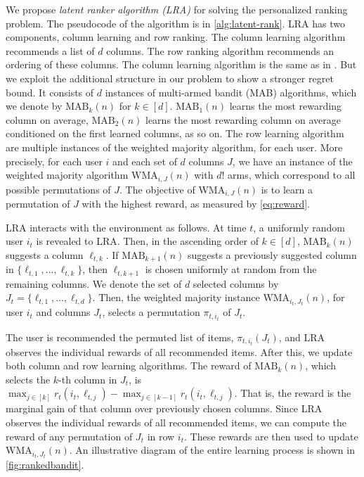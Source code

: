 
We propose \emph{latent ranker algorithm (LRA)} for solving the personalized ranking problem. The pseudocode of the algorithm is in \cref{alg:latent-rank}. LRA has two components, column learning and row ranking. The column learning algorithm recommends a list of $d$ columns. The row ranking algorithm recommends an ordering of these columns. The column learning algorithm is the same as in  \citet{radlinski2008learning}. But we exploit the additional structure in our problem to show a stronger regret bound. It consists of $d$ instances of multi-armed bandit (MAB) algorithms, which we denote by $\textrm{MAB}_k(n)$ for $k \in [d]$. $\textrm{MAB}_1(n)$ learns the most rewarding column on average, $\textrm{MAB}_2(n)$ learns the most rewarding column on average conditioned on the first learned columns, as so on. The row learning algorithm are multiple instances of the weighted majority algorithm, for each user. More precisely, for each user $i$ and each set of $d$ columns $J$, we have an instance of the weighted majority algorithm $\textrm{WMA}_{i, J}(n)$ with $d!$ arms, which correspond to all possible permutations of $J$. The objective of $\textrm{WMA}_{i, J}(n)$ is to learn a permutation of $J$ with the highest reward, as measured by \eqref{eq:reward}.

LRA interacts with the environment as follows. At time $t$, a uniformly random user $i_t$ is revealed to LRA. Then, in the ascending order of $k \in [d]$, $\textrm{MAB}_k(n)$ suggests a column $\ell_{t, k}$. If $\textrm{MAB}_{k + 1}(n)$ suggests a previously suggested column in $\{\ell_{t, 1}, \dots, \ell_{t, k}\}$, then $\ell_{t, k + 1}$ is chosen uniformly at random from the remaining columns. We denote the set of $d$ selected columns by $J_t = \{\ell_{t, 1}, \dots, \ell_{t, d}\}$. Then, the weighted majority instance $\textrm{WMA}_{i_t, J_t}(n)$, for user $i_t$ and columns $J_t$, selects a permutation $\pi_{t, i_t}$ of $J_t$.

The user is recommended the permuted list of items, $\pi_{t, i_t}(J_t)$, and LRA observes the individual rewards of all recommended items. After this, we update both column and row learning algorithms. The reward of $\textrm{MAB}_k(n)$, which selects the $k$-th column in $J_t$, is $\max_{j \in [k]} r_t(i_t, \ell_{t, j}) - \max_{j \in [k - 1]} r_t(i_t, \ell_{t, j})$. That is, the reward is the marginal gain of that column over previously chosen columns. Since LRA observes the individual rewards of all recommended items, we can compute the reward of any permutation of $J_t$ in row $i_t$. These rewards are then used to update $\textrm{WMA}_{i_t, J_t}(n)$. An illustrative diagram of the entire learning process is shown in \cref{fig:rankedbandit}.

